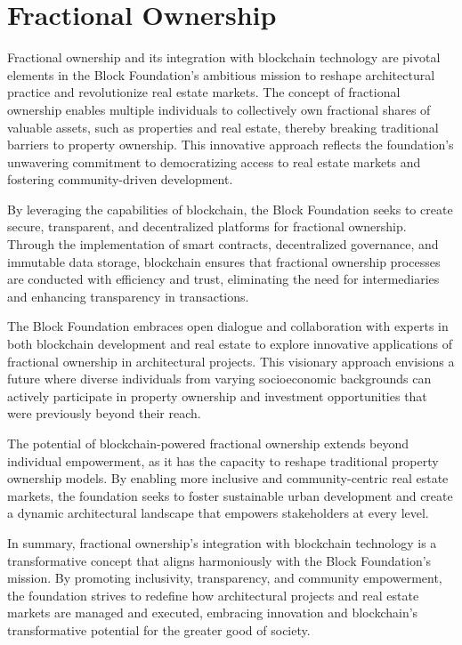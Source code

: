 \section{Fractional Ownership}

Fractional ownership and its integration with blockchain technology are pivotal elements in the Block Foundation's ambitious mission to reshape architectural practice and revolutionize real estate markets. The concept of fractional ownership enables multiple individuals to collectively own fractional shares of valuable assets, such as properties and real estate, thereby breaking traditional barriers to property ownership. This innovative approach reflects the foundation's unwavering commitment to democratizing access to real estate markets and fostering community-driven development.

By leveraging the capabilities of blockchain, the Block Foundation seeks to create secure, transparent, and decentralized platforms for fractional ownership. Through the implementation of smart contracts, decentralized governance, and immutable data storage, blockchain ensures that fractional ownership processes are conducted with efficiency and trust, eliminating the need for intermediaries and enhancing transparency in transactions.

The Block Foundation embraces open dialogue and collaboration with experts in both blockchain development and real estate to explore innovative applications of fractional ownership in architectural projects. This visionary approach envisions a future where diverse individuals from varying socioeconomic backgrounds can actively participate in property ownership and investment opportunities that were previously beyond their reach.

The potential of blockchain-powered fractional ownership extends beyond individual empowerment, as it has the capacity to reshape traditional property ownership models. By enabling more inclusive and community-centric real estate markets, the foundation seeks to foster sustainable urban development and create a dynamic architectural landscape that empowers stakeholders at every level.

In summary, fractional ownership's integration with blockchain technology is a transformative concept that aligns harmoniously with the Block Foundation's mission. By promoting inclusivity, transparency, and community empowerment, the foundation strives to redefine how architectural projects and real estate markets are managed and executed, embracing innovation and blockchain's transformative potential for the greater good of society.